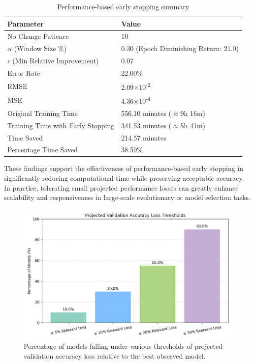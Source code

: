 \begin{table}[ht]
\centering
\begin{tabular}{ll}
\toprule
\textbf{Parameter} & \textbf{Value} \\
\midrule
No Change Patience & 10 \\
$\alpha$ (Window Size \%) & 0.30 (Epoch Diminishing Return: 21.0) \\
$\epsilon$ (Min Relative Improvement) & 0.07 \\
Error Rate & 22.00\% \\
RMSE & 2.09$\times$10\textsuperscript{-2} \\
MSE & 4.36$\times$10\textsuperscript{-4} \\
Original Training Time & 556.10 minutes ($\approx$9h 16m) \\
Training Time with Early Stopping & 341.53 minutes ($\approx$5h 41m) \\
Time Saved & 214.57 minutes \\
Percentage Time Saved & 38.59\% \\
\bottomrule
\end{tabular}
\caption{Performance-based early stopping summary}
\label{tab:performance_stopping_summary}
\end{table}

These findings support the effectiveness of performance-based early stopping in significantly reducing computational time while preserving acceptable accuracy. In practice, tolerating small projected performance losses can greatly enhance scalability and responsiveness in large-scale evolutionary or model selection tasks.


\begin{figure}[ht]
    \centering
    \includegraphics[width=0.85\linewidth]{Pictures/val_accuracy_loss_percentages.png}
    \caption{Percentage of models falling under various thresholds of projected validation accuracy loss relative to the best observed model.}
    \label{fig:performanceStop}
\end{figure}


